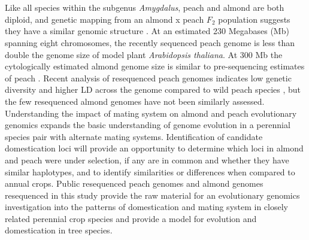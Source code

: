 \documentclass[12pt]{article}
\begin{document}
%
\\
\\
%
Like all species within the subgenus \emph{Amygdalus}, peach and almond are both diploid, and genetic mapping from an almond x peach $F_2$ population suggests they have a similar genomic structure \citep{dirlewanger2004comparative}. 
%
At an estimated 230 Megabases (Mb) spanning eight chromosomes, the recently sequenced peach genome \citep{verde2013high} is less than double the genome size of model plant \emph{Arabidopsis thaliana}. 
%
At 300 Mb the cytologically estimated almond genome size is similar to pre-sequencing estimates of peach \citep{arumuganathan1991nuclear}. 
%
%
%
Recent analysis of resequenced peach genomes indicates low genetic diversity and higher LD across the genome compared to wild peach species \citep{verde2013high}, but the few resequenced almond genomes have not been similarly assessed. 
%
%
%
Understanding the impact of mating system on almond and peach evolutionary genomics expands the basic understanding of genome evolution in a perennial species pair with alternate mating systems. 
%
Identification of candidate domestication loci will provide an opportunity to determine which loci in almond and peach were under selection, if any are in common and whether they have similar haplotypes, and to identify similarities or differences when compared to annual crops. 
%
%
%
Public resequenced peach genomes and almond genomes resequenced in this study provide the raw material for an evolutionary genomics investigation into the patterns of domestication and mating system in closely related perennial crop species and provide a model for evolution and domestication in tree species.
%
\\
\end{document}

